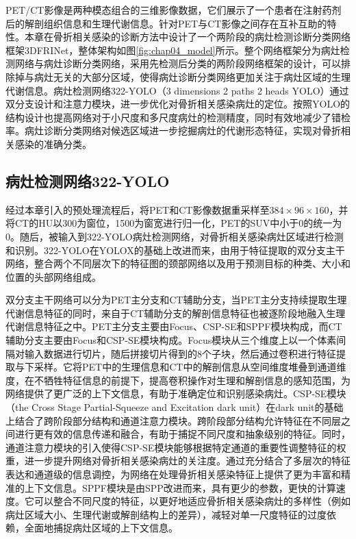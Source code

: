 PET/CT影像是两种模态组合的三维影像数据，它们展示了一个患者在注射药剂后的解剖组织信息和生理代谢信息。针对PET与CT影像之间存在互补互助的特性。本章在骨折相关感染的诊断方法中设计了一个两阶段的病灶检测诊断分类网络框架3DFRINet，整体架构如图\ref{fig:chap04_model}所示。整个网络框架分为病灶检测网络与病灶诊断分类网络，采用先检测后分类的两阶段网络框架的设计，可以排除掉与病灶无关的大部分区域，使得病灶诊断分类网络更加关注于病灶区域的生理代谢信息。病灶检测网络322-YOLO（3 dimensions 2 paths 2 heads YOLO）通过双分支设计和注意力模块，进一步优化对骨折相关感染病灶的定位。按照YOLO的结构设计也提高网络对于小尺度和多尺度病灶的检测精度，同时有效地减少了错检率。病灶诊断分类网络对候选区域进一步挖掘病灶的代谢形态特征，实现对骨折相关感染的准确分类。

\subsection{病灶检测网络322-YOLO}

经过本章引入的预处理流程后，将PET和CT影像数据重采样至\(384 \times 96\times 160\)，并将CT的HU以300为窗位，1500为窗宽进行归一化，PET的SUV中小于0的统一为0。随后，被输入到322-YOLO病灶检测网络，对骨折相关感染病灶区域进行检测和识别。322-YOLO在YOLOX\cite{ge2021yolox}的基础上改进而来，由用于特征提取的双分支主干网络，整合两个不同层次下的特征图的颈部网络以及用于预测目标的种类、大小和位置的头部网络组成。

双分支主干网络可以分为PET主分支和CT辅助分支，当PET主分支持续提取生理代谢信息特征的同时，来自于CT辅助分支的解剖信息特征也被逐阶段地融入生理代谢信息特征之中。PET主分支主要由Focus、CSP-SE和SPPF模块构成，而CT辅助分支主要由Focus和CSP-SE模块构成。Focus模块从三个维度上以一个体素间隔对输入数据进行切片，随后拼接切片得到的8个子块，然后通过卷积进行特征提取与下采样。它将PET中的生理信息和CT中的解剖信息从空间维度堆叠到通道维度，在不牺牲特征信息的前提下，提高卷积操作对生理和解剖信息的感知范围，为网络提供了更广泛的上下文信息，有助于准确定位和识别感染病灶。CSP-SE模块（the Cross Stage Partial-Squeeze and Excitation dark unit）在dark unit的基础上结合了跨阶段部分结构\cite{wang2020cspnet}和通道注意力模块\cite{hu2018squeeze}。跨阶段部分结构允许特征在不同层之间进行更有效的信息传递和融合，有助于捕捉不同尺度和抽象级别的特征。同时，通道注意力模块的引入使得CSP-SE模块能够根据特定通道的重要性调整特征的权重，进一步提升网络对骨折相关感染病灶的关注度。通过充分结合了多层次的特征表达和通道级的信息调控，为网络在处理骨折相关感染特征上提供了更为丰富和精准的上下文信息。SPPF模块是由SPP\cite{he2015spatial}改进而来，具有更少的参数，更快的计算速度。它可以整合不同尺度的特征，以更好地适应骨折相关感染病灶的多样性（例如病灶区域大小、生理代谢或解剖结构上的差异），减轻对单一尺度特征的过度依赖，全面地捕捉病灶区域的上下文信息。

